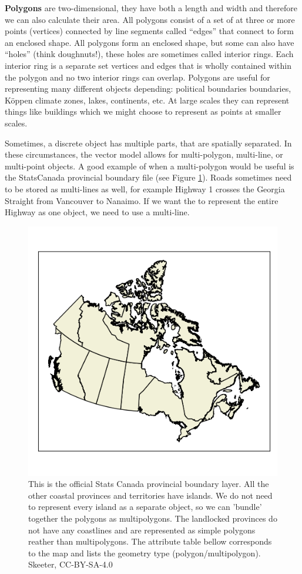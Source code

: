 \documentclass[
]{book}
\begin{document}
\textbf{Polygons} are two-dimensional, they have both a length and width and therefore we can also calculate their area. All polygons consist of a set of at three or more points (vertices) connected by line segments called ``edges'' that connect to form an enclosed shape. All polygons form an enclosed shape, but some can also have ``holes'' (think doughnuts!), these holes are sometimes called interior rings. Each interior ring is a separate set vertices and edges that is wholly contained within the polygon and no two interior rings can overlap. Polygons are useful for representing many different objects depending: political boundaries boundaries, Köppen climate zones, lakes, continents, etc. At large scales they can represent things like buildings which we might choose to represent as points at smaller scales.

Sometimes, a discrete object has multiple parts, that are spatially separated. In these circumstances, the vector model allows for multi-polygon, multi-line, or multi-point objects. A good example of when a multi-polygon would be useful is the StatsCanada provincial boundary file (see Figure \ref{fig:3-vector-2}). Roads sometimes need to be stored as multi-lines as well, for example Highway 1 crosses the Georgia Straight from Vancouver to Nanaimo. If we want the to represent the entire Highway as one object, we need to use a multi-line.

\begin{figure}
\includegraphics[width=0.75\linewidth]{images/03-vector} \caption{This is the official Stats Canada provincial boundary layer. All the other coastal provinces and territories have islands. We do not need to represent every island as a separate object, so we can 'bundle' together the polygons as multipolygons. The landlocked provinces do not have any coastlines and are represented as simple polygons reather than multipolygons. The attribute table bellow corresponds to the map and lists the geometry type (polygon/multipolygon). Skeeter, CC-BY-SA-4.0}\label{fig:3-vector-2}
\end{figure}
\end{document}
